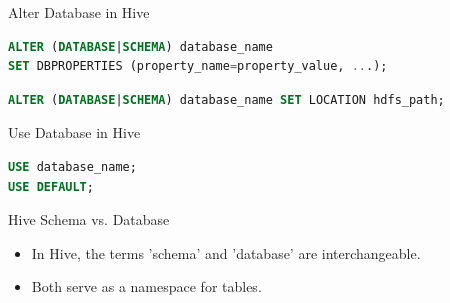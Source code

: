 \begin{frame}[fragile]{Alter Database in Hive}

\begin{lstlisting}[caption={Alter Database command in Hive},language=SQL]
ALTER (DATABASE|SCHEMA) database_name 
SET DBPROPERTIES (property_name=property_value, ...);
\end{lstlisting}		
\begin{lstlisting}[caption={Alter Database Example},language=SQL]
ALTER (DATABASE|SCHEMA) database_name SET LOCATION hdfs_path;
\end{lstlisting}		
\end{frame} 

\begin{frame}[fragile]{Use Database in Hive}

\begin{lstlisting}[caption={Alter Database command in Hive},language=SQL]
USE database_name;
USE DEFAULT;
\end{lstlisting}		
\end{frame} 

\begin{frame}[fragile]{Hive Schema vs. Database}		  
	\begin{itemize}
	  \item In Hive, the terms 'schema' and 'database' are interchangeable.
	  \item Both serve as a namespace for tables.
	\end{itemize}	
	\begin{tcolorbox}[colback=white, colframe=black, title=\scriptsize From Hive Documentation]
		\small {}
	  \end{tcolorbox}
	
\end{frame}


